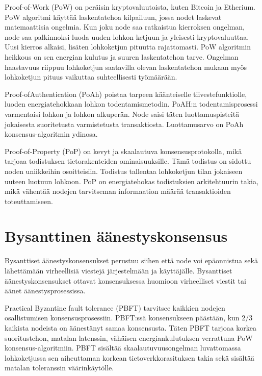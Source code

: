 \documentclass[utf8,bachelor]{gradu3}
\begin{document}
Proof-of-Work (PoW) on peräisin kryptovaluutoista, kuten Bitcoin ja Etherium. PoW algoritmi käyttää laskentatehoa kilpailuun, jossa nodet laskevat matemaattisia ongelmia. 
Kun joku node saa ratkaistua kierroksen ongelman, node saa palkinnoksi luoda uuden lohkon ketjuun ja yleisesti kryptovaluuttaa. Uusi kierros alkaisi, lisäten lohkoketjun pituutta rajattomasti. PoW algoritmin heikkous on sen energian kulutus ja suuren laskentatehon tarve. 
Ongelman haastavuus riippuu lohkoketjun saatavilla olevan laskentatehon mukaan myös lohkoketjun pituus vaikuttaa suhteellisesti työmäärään.

Proof-ofAuthentication (PoAh) poistaa tarpeen käänteiselle tiivestefunktiolle, luoden energiatehokkaan lohkon todentamismetodin. PoAH:n todentamisprosessi varmentaisi lohkon ja lohkon alkuperän.
Node saisi täten luottamuspisteitä jokaisesta suoritetusta varmistetusta transaktiosta. Luottamusarvo on PoAh konsensus-algoritmin ydinosa.

Proof-of-Property (PoP) on kevyt ja skaalautuva konsensusprotokolla, mikä tarjoaa todistuksen tietorakenteiden ominaisuuksille. Tämä todistus on sidottu noden uniikkeihin osoitteisiin. Todistus tallentaa lohkoketjun tilan jokaiseen uuteen luotuun lohkoon. PoP on energiatehokas todistuksien arkitehtuurin takia, mikä vähentää nodejen tarvitseman informaation määrää transaktioiden toteuttamiseen.

\section{Bysanttinen äänestyskonsensus}
Bysanttiset äänestyskonsensukset perustuu siihen että node voi epäonnistua sekä lähettämään virheellisiä viestejä järjestelmään ja käyttäjälle. 
Bysanttiset äänestyskonsensukset ottavat konsensuksessa huomioon virheelliset viestit tai äänet äänestysprosessissa.

Practical Byzantine fault tolerance (PBFT) tarvitsee kaikkien nodejen osallistumisen konsensusprosessiin.
PBFT:ssä konsensukseen päästään, kun 2/3 kaikista nodeista on äänestänyt samaa konsensusta.
Täten PBFT tarjoaa korkea suoritustehon, matalan latenssin, vähäisen energiankulutuksen verrattuna PoW konsensus-algoritmiin.
PBFT sisältää skaalautuvuusongelman luvattomassa lohkoketjussa sen aiheuttaman korkean tietoverkkorasituksen takia sekä sisältää matalan toleranssin väärinkäytölle.
\end{document}
